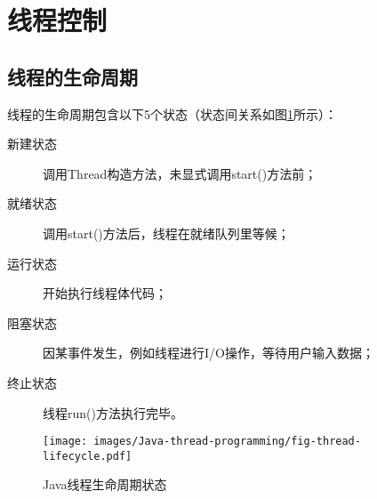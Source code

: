 
\section{线程控制}

\subsection{线程的生命周期}

线程的生命周期包含以下5个状态（状态间关系如图\ref{fig:thread-lifecycle}所示）：

\begin{description}
\item[新建状态] 调用Thread构造方法，未显式调用start()方法前；
\item[就绪状态] 调用start()方法后，线程在就绪队列里等候；
\item[运行状态] 开始执行线程体代码；
\item[阻塞状态] 因某事件发生，例如线程进行I/O操作，等待用户输入数据；
\item[终止状态] 线程run()方法执行完毕。
\end{description}


\begin{figure}[htb]
\centering
\texttt{[image: images/Java-thread-programming/fig-thread-lifecycle.pdf]}
\caption{Java线程生命周期状态}
\label{fig:thread-lifecycle}
\end{figure}

